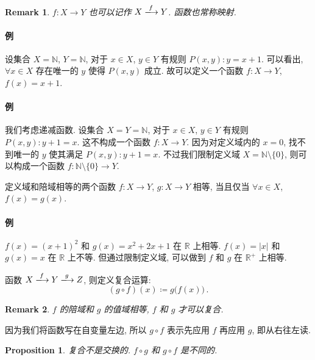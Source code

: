 \documentclass[UTF8]{ctexart}
\theoremstyle{mystyle}
\newtheorem{proposition}{Proposition}[section]
\theoremstyle{myremark}
\newtheorem*{remark}{Remark}
\theoremstyle{plain}
\newcommand{\R}{\mathbb R}
\newcommand{\N}{\mathbb N}
\newcommand{\set}[1]{\{#1\}}
\begin{document}
\begin{remark}
    $ f \colon X \to Y $ 也可以记作 $ X \xlongrightarrow{f} Y $. 函数也常称映射.
\end{remark}

\paragraph{例}
设集合 $ X = \N $, $ Y = \N $, 对于 $ x \in X $, $ y \in Y $ 有规则 $ P(x, y): y = x + 1 $. 可以看出, $ \forall x \in X $ 存在唯一的 $ y $ 使得 $ P(x, y) $ 成立. 故可以定义一个函数 $ f \colon X \to Y $, $ f(x) = x + 1 $.

\paragraph{例}
我们考虑递减函数. 设集合 $ X = Y = \N $, 对于 $ x \in X $, $ y \in Y $ 有规则 $ P(x, y): y + 1 = x $. 这不构成一个函数 $ f \colon X \to Y $. 因为对定义域内的 $ x = 0 $, 找不到唯一的 $ y $ 使其满足 $ P(x, y): y + 1 = x $. 不过我们限制定义域 $ X = \N \setminus \set{0} $, 则可以构成一个函数 $ f \colon \N \setminus \set{0} \to Y $.

\begin{definition}
    定义域和陪域相等的两个函数 $ f \colon X \to Y $, $ g: X \to Y $ 相等, 当且仅当 $ \forall x \in X $, $ f(x) = g(x) $.
\end{definition}

\paragraph{例}
$ f(x) = (x + 1)^2 $ 和 $ g(x) = x^2 + 2 x + 1 $ 在 $ \R $ 上相等. $ f(x) = |x| $ 和 $ g(x) = x $ 在 $ \R $ 上不等. 但通过限制定义域, 可以做到 $ f $ 和 $ g $ 在 $ \R^+ $ 上相等.

\begin{definition}
    函数 $ X \xlongrightarrow{f} Y \xlongrightarrow{g} Z $, 则定义复合运算: \[ (g \circ f)(x) \coloneqq g \big( f(x) \big) \,.\]
\end{definition}

\begin{remark}
    $ f $ 的陪域和 $ g $ 的值域相等, $ f $ 和 $ g $ 才可以复合.
\end{remark}

因为我们将函数写在自变量左边, 所以 $ g \circ f $ 表示先应用 $ f $ 再应用 $ g $, 即从右往左读.

\begin{proposition}
    复合不是交换的. $ f \circ g $ 和 $ g \circ f $ 是不同的.
\end{proposition}
\end{document}
